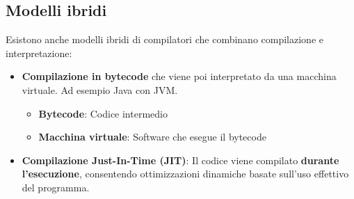 \documentclass[a4paper]{article}
\begin{document}
\subsection{Modelli ibridi}
Esistono anche modelli ibridi di compilatori che combinano compilazione e interpretazione:
\begin{itemize}
  \item \textbf{Compilazione in bytecode} che viene poi interpretato da una macchina
    virtuale. Ad esempio Java con JVM.
    \begin{itemize}
      \item \textbf{Bytecode}: Codice intermedio
      \item \textbf{Macchina virtuale}: Software che esegue il bytecode
    \end{itemize}

  \item \textbf{Compilazione Just-In-Time (JIT)}: Il codice viene compilato
    \textbf{durante l'esecuzione}, consentendo ottimizzazioni dinamiche basate sull'uso
    effettivo del programma.
\end{itemize}
\end{document}
